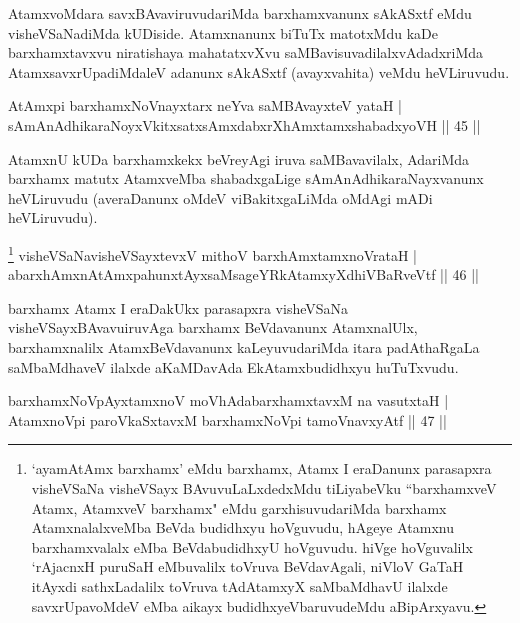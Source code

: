 \begin{artha}%
AtamxvoMdara savxBAvaviruvudariMda barxhamxvanunx sAkASxtf eMdu visheVSaNadiMda kUDiside. Atamxnanunx biTuTx matotxMdu kaDe barxhamxtavxvu niratishaya mahatatxvXvu saMBavisuvadilalxvAdadxriMda AtamxsavxrUpa\-\break diMdaleV adanunx sAkASxtf (avayxvahita) veMdu heVLiruvudu.
\end{artha}

\begin{shl}
AtAmx\s pi barxhamxNoV\s nayxtarx neYva saMBAvayxteV yataH |\\
sAmAnAdhikaraNoyxVkitxsatxsAmxdabxrXhAmxtamxshabadxyoVH \hfill || 45 ||
\end{shl}

\begin{artha}
AtamxnU kUDa barxhamxkekx beVreyAgi iruva saMBavavilalx, AdariMda barxhamx matutx AtamxveMba shabadxgaLige sAmAnAdhikaraNayxvanunx heVLiruvudu (averaDanunx oMdeV viBakitxgaLiMda oMdAgi mADi heVLiruvudu).
\end{artha}

\begin{shl}
\footnote{`ayamAtAmx barxhamx' eMdu barxhamx, Atamx I eraDanunx parasapxra visheVSaNa visheVSayx BAvuvuLaLxdedxMdu tiLiyabeVku ``barxhamxveV Atamx, AtamxveV barxhamx" eMdu garxhisuvudariMda barxhamx AtamxnalalxveMba BeVda budidhxyu hoVguvudu, hAgeye Atamxnu barxhamxvalalx eMba BeVdabudidhxyU hoVguvudu. hiVge hoVguvalilx `rAjacnxH puruSaH eMbuvalilx toVruva BeVdavAgali, niVloV GaTaH itAyxdi sathxLadalilx toVruva tAdAtamxyX saMbaMdhavU ilalxde savxrUpavoMdeV eMba aikayx budidhxyeVbaruvudeMdu aBipArxyavu.} visheVSaNavisheVSayxtevxV mithoV barxhAmxtamxnoVrataH |\\
abarxhAmxnAtAmxpahunxtAyx\s saMsageYRkAtamxyXdhiVBaRveVtf \hfill || 46 ||
\end{shl}

\begin{artha}
barxhamx Atamx I eraDakUkx parasapxra visheVSaNa visheVSayxBAvavu\break iruvAga barxhamx BeVdavanunx AtamxnalUlx, barxhamxnalilx AtamxBeVdavanunx kaLeyuvudariMda itara padAthaRgaLa saMbaMdhaveV ilalxde aKaMDavAda EkAtamxbudidhxyu huTuTxvudu.
\end{artha}

\begin{shl}
barxhamxNoV\s pAyxtamxnoV moVhAdabarxhamxtavxM na vasutxtaH |\\
AtamxnoV\s pi paroVkaSxtavxM barxhamxNoV\s pi tamoVnavxyAtf \hfill || 47 ||
\end{shl}	

